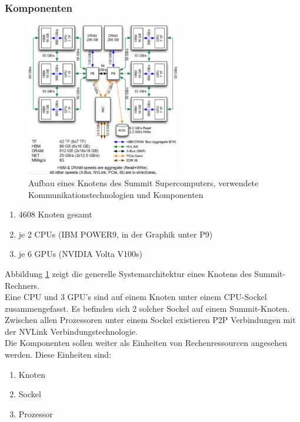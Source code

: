 \subsubsection{Komponenten}

\begin{figure}
\centering
\includegraphics[width=0.6\textwidth]{res/architecture.png}
\caption{\cite[Abb. 1]{mainpaper} Aufbau eines Knotens des Summit Supercomputers, verwendete Kommunikationstechnologien und Komponenten}
	\label{fig:architecture}
\end{figure}
\begin{enumerate}
	\item 4608 Knoten gesamt
	\item je 2 CPUs (IBM POWER9, in der Graphik unter P9)
	\item je 6 GPUs (NVIDIA Volta V100s)
\end{enumerate} \cite{osummit}
Abbildung \ref{fig:architecture} zeigt die generelle Systemarchitektur eines Knotens des Summit-Rechners.\\
Eine CPU und 3 GPU's sind auf einem Knoten unter einem CPU-Sockel zusammengefasst. Es befinden sich 2 solcher Sockel auf einem Summit-Knoten. Zwischen allen Prozessoren unter einem Sockel existieren P2P Verbindungen mit der NVLink Verbindungstechnologie.\\
Die Komponenten sollen weiter als Einheiten von Rechenressourcen angesehen werden. Diese Einheiten sind:
\begin{enumerate}
	\item Knoten
	\item Sockel
	\item Prozessor
\end{enumerate}

